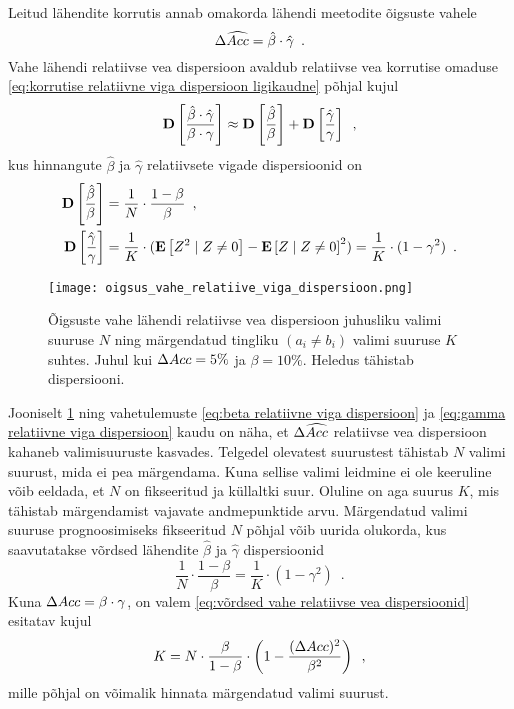 Leitud lähendite korrutis annab omakorda lähendi meetodite õigsuste vahele
\begin{equation*}
    \Delta\widehat{Acc}=\hat{\beta}\cdot\hat{\gamma} \enspace.
\end{equation*}
Vahe lähendi relatiivse vea dispersioon avaldub relatiivse vea korrutise omaduse \eqref{eq:korrutise relatiivne viga dispersioon ligikaudne} põhjal kujul
\begin{equation}
    \operatorname*{\mathbf{D}}\left[\frac{\hat{\beta}\cdot\hat{\gamma}}{\beta\cdot\gamma}\right]\approx\operatorname*{\mathbf{D}}\left[\frac{\hat{\beta}}{\beta}\right]+\operatorname*{\mathbf{D}}\left[\frac{\hat{\gamma}}{\gamma}\right] \enspace,
\end{equation}
kus hinnangute $\hat{\beta}$ ja $\hat{\gamma}$ relatiivsete vigade dispersioonid on
\begin{align}
    \operatorname*{\mathbf{D}}\left[\frac{\hat{\beta}}{\beta}\right]&=\frac{1}{N}\cdot\frac{1-\beta}{\beta} \enspace, \label{eq:beta relatiivne viga dispersioon} \\
    \operatorname*{\mathbf{D}}\left[\frac{\hat{\gamma}}{\gamma}\right]&=\frac{1}{K}\cdot(\operatorname*{\mathbf{E}}\left[Z^2 \mid Z\neq 0\right]-\operatorname*{\mathbf{E}}\left[Z \mid Z\neq 0\right]^2)=\frac{1}{K}\cdot(1-\gamma^2) \enspace. \label{eq:gamma relatiivne viga dispersioon}
\end{align}

\begin{figure}[H]
    \begin{center}
        \texttt{[image: oigsus\_vahe\_relatiive\_viga\_dispersioon.png]}  
    \end{center}
    \caption{Õigsuste vahe lähendi relatiivse vea dispersioon juhusliku valimi suuruse $N$ ning märgendatud tingliku $(a_i \neq b_i)$ valimi suuruse $K$ suhtes. Juhul kui $\Delta Acc=5\%$ ja $\beta=10\%$. Heledus tähistab dispersiooni.}
    \label{fig:õigsus vahe lähend relatiivne viga dispersioon}
\end{figure}

Jooniselt \ref{fig:õigsus vahe lähend relatiivne viga dispersioon} ning vahetulemuste \eqref{eq:beta relatiivne viga dispersioon} ja \eqref{eq:gamma relatiivne viga dispersioon} kaudu on näha, et $\Delta\widehat{Acc}$ relatiivse vea dispersioon kahaneb valimisuuruste kasvades. Telgedel olevatest suurustest tähistab $N$ valimi suurust, mida ei pea märgendama. Kuna sellise valimi leidmine ei ole keeruline võib eeldada, et $N$ on fikseeritud ja küllaltki suur. Oluline on aga suurus $K$, mis tähistab märgendamist vajavate andmepunktide arvu. Märgendatud valimi suuruse prognoosimiseks fikseeritud $N$ põhjal võib uurida olukorda, kus saavutatakse võrdsed lähendite $\hat{\beta}$ ja $\hat{\gamma}$ dispersioonid
\begin{equation}
    \label{eq:võrdsed vahe relatiivse vea dispersioonid}
    \frac{1}{N}\cdot\frac{1-\beta}{\beta}=\frac{1}{K}\cdot(1-\gamma^2) \enspace.
\end{equation}
Kuna $\Delta Acc=\beta\cdot\gamma$, on valem \eqref{eq:võrdsed vahe relatiivse vea dispersioonid} esitatav kujul
\begin{equation}    
    K = N \cdot \frac{\beta}{1-\beta} \cdot \left( 1 - \frac{(\Delta Acc)^2}{\beta^2} \right) \enspace,
\end{equation}
mille põhjal on võimalik hinnata märgendatud valimi suurust.

